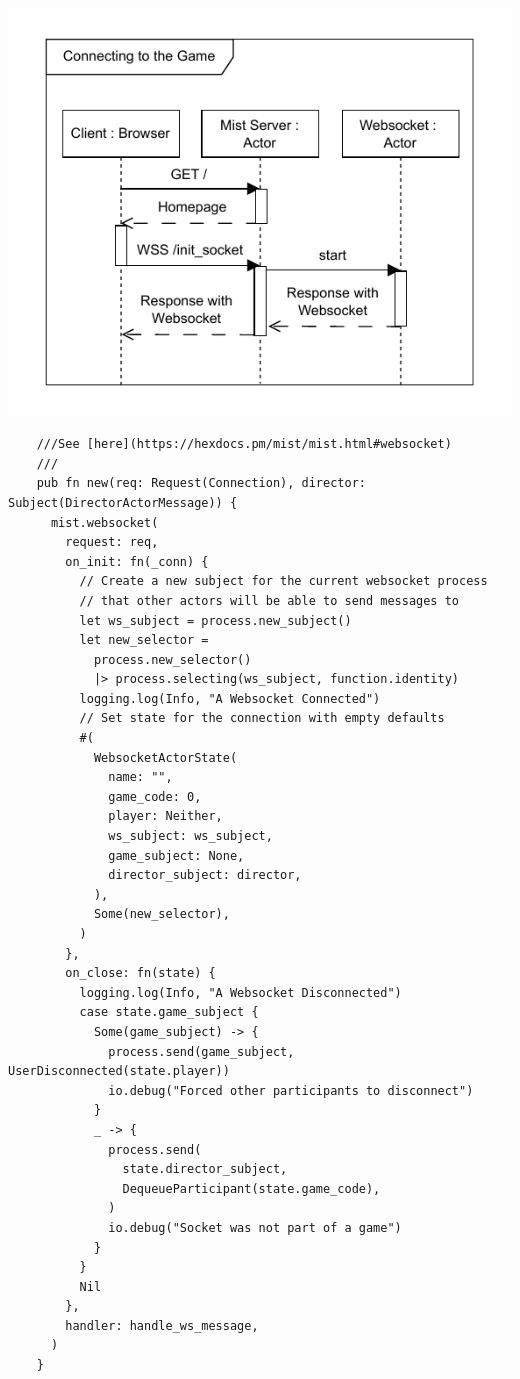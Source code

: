 \documentclass[]{interim}
\begin{document}
\begin{minipage}[t]{20em}
  \includegraphics[width=\textwidth]{sequence_connecting}
  \label{fig: 5}
  \vspace*{0.5cm}
  \begin{lstlisting}
    ///See [here](https://hexdocs.pm/mist/mist.html#websocket)
    ///
    pub fn new(req: Request(Connection), director: Subject(DirectorActorMessage)) {
      mist.websocket(
        request: req,
        on_init: fn(_conn) {
          // Create a new subject for the current websocket process
          // that other actors will be able to send messages to
          let ws_subject = process.new_subject()
          let new_selector =
            process.new_selector()
            |> process.selecting(ws_subject, function.identity)
          logging.log(Info, "A Websocket Connected")
          // Set state for the connection with empty defaults
          #(
            WebsocketActorState(
              name: "",
              game_code: 0,
              player: Neither,
              ws_subject: ws_subject,
              game_subject: None,
              director_subject: director,
            ),
            Some(new_selector),
          )
        },
        on_close: fn(state) {
          logging.log(Info, "A Websocket Disconnected")
          case state.game_subject {
            Some(game_subject) -> {
              process.send(game_subject, UserDisconnected(state.player))
              io.debug("Forced other participants to disconnect")
            }
            _ -> {
              process.send(
                state.director_subject,
                DequeueParticipant(state.game_code),
              )
              io.debug("Socket was not part of a game")
            }
          }
          Nil
        },
        handler: handle_ws_message,
      )
    }
  \end{lstlisting}
\end{minipage}
\end{document}

